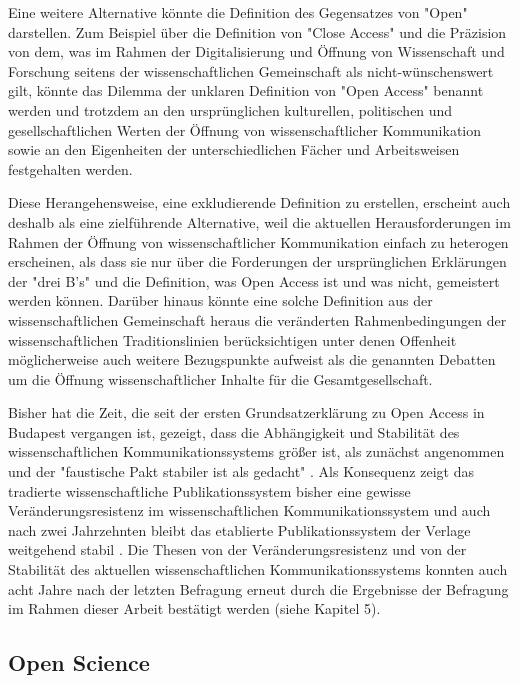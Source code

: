 Eine weitere Alternative könnte die Definition des Gegensatzes von "Open" darstellen. Zum Beispiel über die Definition von "Close Access" und die Präzision von dem, was im Rahmen der Digitalisierung und Öffnung von Wissenschaft und Forschung seitens der wissenschaftlichen Gemeinschaft als nicht-wünschenswert gilt, könnte das Dilemma der unklaren Definition von "Open Access" benannt werden und trotzdem an den ursprünglichen kulturellen, politischen und gesellschaftlichen Werten der Öffnung von wissenschaftlicher Kommunikation sowie an den Eigenheiten der unterschiedlichen Fächer und Arbeitsweisen festgehalten werden.

Diese Herangehensweise, eine exkludierende Definition zu erstellen, erscheint auch deshalb als eine zielführende Alternative, weil die aktuellen Herausforderungen im Rahmen der Öffnung von wissenschaftlicher Kommunikation einfach zu heterogen erscheinen, als dass sie nur über die Forderungen der ursprünglichen Erklärungen der "drei B's" und die Definition, was Open Access ist und was nicht, gemeistert werden können. Darüber hinaus könnte eine solche Definition aus der wissenschaftlichen Gemeinschaft heraus die veränderten Rahmenbedingungen der wissenschaftlichen Traditionslinien berücksichtigen unter denen Offenheit möglicherweise auch weitere Bezugspunkte aufweist als die genannten Debatten um die Öffnung wissenschaftlicher Inhalte für die Gesamtgesellschaft.

Bisher hat die Zeit, die seit der ersten Grundsatzerklärung zu Open Access in Budapest vergangen ist, gezeigt, dass die Abhängigkeit und Stabilität des wissenschaftlichen Kommunikationssystems größer ist, als zunächst angenommen und der "faustische Pakt stabiler ist als gedacht" \cite{Hagner_2015}. Als Konsequenz zeigt das tradierte wissenschaftliche Publikationssystem bisher eine gewisse Veränderungsresistenz im wissenschaftlichen Kommunikationssystem und auch nach zwei Jahrzehnten bleibt das etablierte Publikationssystem der Verlage weitgehend stabil \cite{Hanekop_2014}. Die Thesen von der Veränderungsresistenz und von der Stabilität des aktuellen wissenschaftlichen Kommunikationssystems konnten auch acht Jahre nach der letzten Befragung \cite{Hanekop_2007} erneut durch die Ergebnisse der Befragung im Rahmen dieser Arbeit bestätigt werden (siehe Kapitel 5).

\subsection{Open Science}

